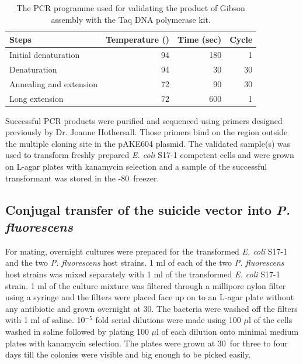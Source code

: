 		\begin{table}[htbp]
		\caption{The PCR programme used for validating the product of Gibson assembly with the Taq DNA polymerase kit.}
		\label{tab:validategibson}
		\begin{center}
		\begin{tabular}{lrrr}
			\toprule[2pt]
			\textbf{Steps}          & \multicolumn{1}{l}{\textbf{Temperature (\textcelsius)}} & \multicolumn{1}{l}{\textbf{Time (sec)}} & \multicolumn{1}{l}{\textbf{Cycle}} \\ \midrule[1pt]
			Initial denaturation    &                                                      94 &                                      180 &                                  1 \\
			Denaturation            &                                                      94 &                                      30 &                                 30 \\
			Annealing and extension &                                                      72 &                                      90 &                                 30 \\
			Long extension          &                                                      72 &                                     600 &                                  1 \\ \bottomrule[2pt]
		\end{tabular}
		\end{center}
		\end{table}
		
		Successful PCR products were purified and sequenced using primers designed previously by Dr. Joanne Hothersall. Those primers bind on the region outside the multiple cloning site in the pAKE604 plasmid. The validated sample(s) was used to transform freshly prepared \textit{E. coli} S17-1 competent cells and were grown on L-agar plates with kanamycin selection and a sample of the successful transformant was stored in the -80\textcelsius \ freezer. 
		
		\subsection{Conjugal transfer of the suicide vector into \textit{P. fluorescens}}
		\label{sec:mating}
		For mating, overnight cultures were prepared for the transformed \textit{E. coli} S17-1 and the two \textit{P. fluorescens} host strains. 1 ml of each of the two \textit{P. fluorescens} host strains was mixed separately with 1 ml of the transformed \textit{E. coli} S17-1 strain. 1 ml of the culture mixture was filtered through a millipore nylon filter using a syringe and the filters were placed face up on to an L-agar plate without any antibiotic and grown overnight at 30\textcelsius. The bacteria were washed off the filters with 1 ml of saline. 10$ ^{-5} $ fold serial dilutions were made using 100 $\mu$l of the cells washed in saline followed by plating 100 $\mu$l of each dilution onto minimal medium plates with kanamycin selection. The plates were grown at 30\textcelsius \ for three to four days till the colonies were visible and big enough to be picked easily.
		
